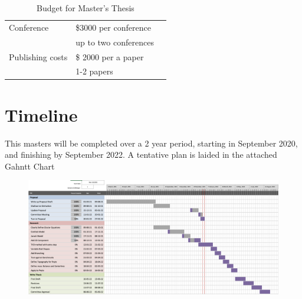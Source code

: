 \documentclass{article}
\begin{document}
\begin{table}[h]
    \centering
    \begin{tabular}{lll}
    Conference
         &  \$3000 per conference\\
         & up to two conferences \\
    Publishing costs
        & \$ 2000 per a paper \\
        & 1-2 papers \\
    
    \end{tabular}
    \caption{Budget for Master's Thesis}
    \label{tab:my_label}
\end{table}

\section{Timeline}
This masters will be completed over a 2 year period, starting in September 2020, and finishing by September 2022. A tentative plan is laided in the attached Gahntt Chart

\begin{figure}[H]
    \centering
    \includegraphics[width=17cm]{Proposal/GahnttChart.png}
    
    \label{fig:Gahntt Chart}
\end{figure}



\end{document}
